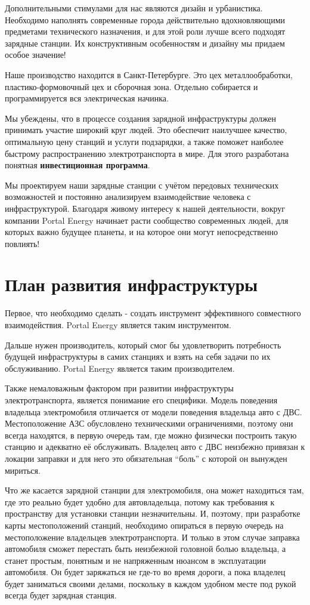 \documentclass[a4paper,12pt]{report}
\begin{document}
Дополнительными стимулами для нас являются дизайн и урбанистика. Необходимо наполнять современные города действительно вдохновляющими предметами технического назначения, и для этой роли лучше всего подходят зарядные станции. Их конструктивным особенностям и дизайну мы придаем особое значение!

Наше производство находится в Санкт-Петербурге. Это цех металлообработки, пластико-формовочный цех и сборочная зона. Отдельно собирается и программируется вся электрическая начинка.

Мы убеждены, что в процессе создания зарядной инфраструктуры должен принимать участие широкий круг людей. Это обеспечит наилучшее качество, оптимальную цену станций и услуги подзарядки, а также поможет наиболее быстрому распространению электротранспорта в мире. Для этого разработана понятная \textbf{инвестиционная программа}.

Мы проектируем наши зарядные станции с учётом передовых технических возможностей и постоянно анализируем взаимодействие человека с инфраструктурой. Благодаря живому интересу к нашей деятельности, вокруг компании Portal Energy начинает расти сообщество современных людей, для которых важно будущее планеты, и на которое они могут непосредственно повлиять!

\chapter{План развития инфраструктуры}
Первое, что необходимо сделать - создать инструмент эффективного совместного взаимодействия. Portal Energy является таким инструментом. 

Дальше нужен производитель, который смог бы удовлетворить потребность будущей инфраструктуры в самих станциях и взять на себя задачи по их обслуживанию. Portal Energy является таким производителем.

Также немаловажным фактором при развитии инфраструктуры электротранспорта, является понимание его специфики. Модель поведения владельца электромобиля отличается от модели поведения владельца авто с ДВС. Местоположение АЗС обусловлено техническими ограничениями, поэтому они всегда находятся, в первую очередь там, где можно физически построить такую станцию и адекватно её обслуживать. Владелец авто с ДВС неизбежно привязан к локации заправки и для него это обязательная “боль” с которой он вынужден мириться. 

Что же касается зарядной станции для электромобиля, она может находиться там, где это реально будет удобно для автовладельца, потому как требования к пространству для установки станции незначительны. И, поэтому, при разработке карты местоположений станций, необходимо опираться в первую очередь на местоположение владельцев электротранспорта. И только в этом случае заправка автомобиля сможет перестать быть неизбежной головной болью владельца, а станет простым, понятным и не напряженным нюансом в эксплуатации автомобиля. Он будет заряжаться не где-то во время дороги, а пока владелец будет заниматься своими делами, поскольку в каждом удобном месте под рукой всегда будет зарядная станция.
\end{document}
